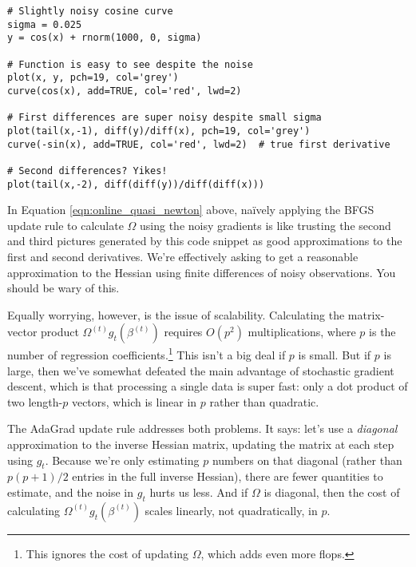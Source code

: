 \documentclass{mynotes}
\begin{document}
\begin{enumerate}[(A)]
\begin{verbatim}
# Slightly noisy cosine curve
sigma = 0.025
y = cos(x) + rnorm(1000, 0, sigma)

# Function is easy to see despite the noise
plot(x, y, pch=19, col='grey')
curve(cos(x), add=TRUE, col='red', lwd=2)

# First differences are super noisy despite small sigma
plot(tail(x,-1), diff(y)/diff(x), pch=19, col='grey')
curve(-sin(x), add=TRUE, col='red', lwd=2)  # true first derivative

# Second differences? Yikes!
plot(tail(x,-2), diff(diff(y))/diff(diff(x)))
\end{verbatim}
In Equation \ref{eqn:online_quasi_newton} above, na\"ively applying the BFGS update rule to calculate $\Omega$ using the noisy gradients is like trusting the second and third pictures generated by this code snippet as good approximations to the first and second derivatives.  We're effectively asking to get a reasonable approximation to the Hessian using finite differences of noisy observations.  You should be wary of this.

Equally worrying, however, is the issue of scalability.  Calculating the matrix-vector product $\Omega^{(t)} g_t(\beta^{(t)})$ requires $O(p^2)$ multiplications, where $p$ is the number of regression coefficients.\footnote{This ignores the cost of updating $\Omega$, which adds even more flops.}  This isn't a big deal if $p$ is small.  But if $p$ is large, then we've somewhat defeated the main advantage of stochastic gradient descent, which is that processing a single data is super fast: only a dot product of two length-$p$ vectors, which is linear in $p$ rather than quadratic.

The AdaGrad update rule addresses both problems.  It says: let's use a \textit{diagonal} approximation to the inverse Hessian matrix, updating the matrix at each step using $g_t$.  Because we're only estimating $p$ numbers on that diagonal (rather than $p(p+1)/2$ entries in the full inverse Hessian), there are fewer quantities to estimate, and the noise in $g_t$ hurts us less.  And if $\Omega$ is diagonal, then the cost of calculating $\Omega^{(t)} g_t(\beta^{(t)})$ scales linearly, not quadratically, in $p$.


\end{enumerate}
\end{document}
